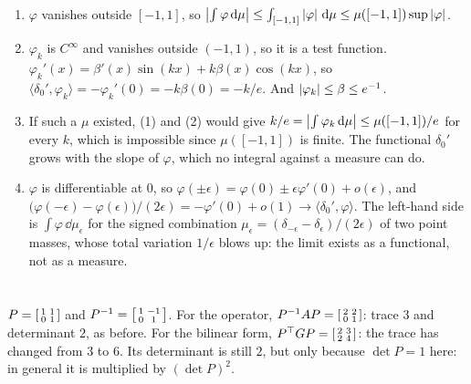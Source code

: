 \begin{enumerate}[nosep]
  \item $\varphi$ vanishes outside $[-1, 1]$, so
        $\left|\int\varphi\,\mathrm{d}\mu\right|\leq\int_{[-1, 1]}\left|\varphi\right|\,\mathrm{d}\mu
        \leq\mu([-1, 1])\sup\left|\varphi\right|$.
  \item $\varphi_k$ is $C^\infty$ and vanishes outside $(-1, 1)$, so it
        is a test function. $\varphi_k'(x) = \beta'(x)\sin(kx)
        + k\beta(x)\cos(kx)$, so $\langle\delta_0', \varphi_k\rangle
        = -\varphi_k'(0) = -k\beta(0) = -k/e$. And
        $\left|\varphi_k\right|\leq\beta\leq e^{-1}$.
  \item If such a $\mu$ existed, (1) and (2) would give
        $k/e = \left|\int\varphi_k\,\mathrm{d}\mu\right|\leq\mu([-1, 1])/e$ for every
        $k$, which is impossible since $\mu([-1, 1])$ is finite. The
        functional $\delta_0'$ grows with the slope of $\varphi$, which
        no integral against a measure can do.
  \item $\varphi$ is differentiable at $0$, so
        $\varphi(\pm\epsilon) = \varphi(0) \pm \epsilon\varphi'(0)
        + o(\epsilon)$, and
        $\bigl(\varphi(-\epsilon) - \varphi(\epsilon)\bigr)/(2\epsilon)
        = -\varphi'(0) + o(1)\to\langle\delta_0', \varphi\rangle$.
        The left-hand side is
        $\int\varphi\,\dd\mu_\epsilon$ for the signed combination
        $\mu_\epsilon = (\delta_{-\epsilon} - \delta_\epsilon)/(2\epsilon)$
        of two point masses, whose total variation $1/\epsilon$ blows
        up: the limit exists as a functional, not as a measure.
\end{enumerate}

\section{}

$P = \begin{bsmallmatrix}1 & 1\\ 0 & 1\end{bsmallmatrix}$ and
$P^{-1} = \begin{bsmallmatrix}1 & -1\\ 0 & 1\end{bsmallmatrix}$. For
the operator,
$P^{-1}AP = \begin{bsmallmatrix}2 & 2\\ 0 & 1\end{bsmallmatrix}$: trace
$3$ and determinant $2$, as before. For the bilinear form,
$P^\top GP = \begin{bsmallmatrix}2 & 3\\ 2 & 4\end{bsmallmatrix}$: the
trace has changed from $3$ to $6$. Its determinant is still $2$, but
only because $\det P = 1$ here: in general it is multiplied by
$(\det P)^2$.

